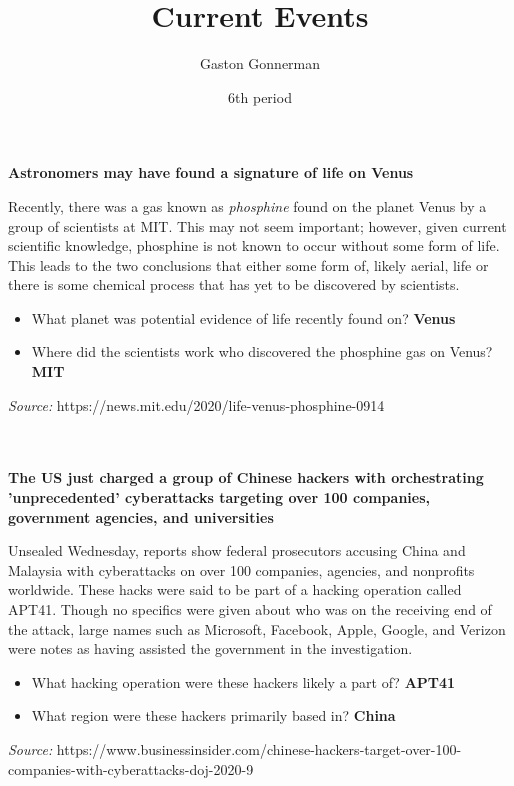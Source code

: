\documentclass{article}
\title{Current Events}
\author{Gaston Gonnerman}
\date{6th period}
\begin{document}
	\maketitle
	
	\begin{center}
		\large{
			\textbf{Astronomers may have found a signature of life on Venus}
		}
	\end{center}
	\par Recently, there was a gas known as \emph{phosphine} found on the planet Venus by a group of scientists at MIT. This may not seem important; however, given current scientific knowledge, phosphine is not known to occur without some form of life. This leads to the two conclusions that either some form of, likely aerial, life or there is some chemical process that has yet to be discovered by scientists.
	
	\begin{itemize}[label=--]
		\item What planet was potential evidence of life recently found on? \textbf{Venus}
		\item Where did the scientists work who discovered the phosphine gas on Venus? \textbf{MIT}
	\end{itemize}

	\noindent
	\emph{Source:} https://news.mit.edu/2020/life-venus-phosphine-0914
	\\ \\ \\
	
	\begin{center}
		\large{
			\textbf{The US just charged a group of Chinese hackers with orchestrating 'unprecedented' cyberattacks targeting over 100 companies, government agencies, and universities}
		}
	\end{center}
	\par Unsealed Wednesday, reports show federal prosecutors accusing China and Malaysia with cyberattacks on over 100 companies, agencies, and nonprofits worldwide. These hacks were said to be part of a hacking operation called APT41. Though no specifics were given about who was on the receiving end of the attack, large names such as Microsoft, Facebook, Apple, Google, and Verizon were notes as having assisted the government in the investigation.
	
	\begin{itemize}[label=--]
		\item What hacking operation were these hackers likely a part of? \textbf{APT41}
		\item What region were these hackers primarily based in? \textbf{China}
	\end{itemize}

	\noindent
	\emph{Source:} https://www.businessinsider.com/chinese-hackers-target-over-100-companies-with-cyberattacks-doj-2020-9
\end{document}

